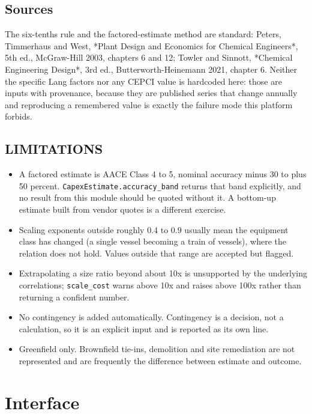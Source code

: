 \documentclass[10pt,a4paper,twoside]{report}
\begin{document}
\subsection*{Sources}

The six-tenths rule and the factored-estimate method are standard: Peters, Timmerhaus and West, *Plant Design and Economics for Chemical Engineers*, 5th ed., McGraw-Hill 2003, chapters 6 and 12; Towler and Sinnott, *Chemical Engineering Design*, 3rd ed., Butterworth-Heinemann 2021, chapter 6. Neither the specific Lang factors nor any CEPCI value is hardcoded here: those are inputs with provenance, because they are published series that change annually and reproducing a remembered value is exactly the failure mode this platform forbids.

\subsection*{LIMITATIONS}

\begin{itemize}
\item A factored estimate is AACE Class 4 to 5, nominal accuracy minus 30 to plus 50 percent. \texttt{CapexEstimate.accuracy\_band} returns that band explicitly, and no result from this module should be quoted without it. A bottom-up estimate built from vendor quotes is a different exercise.
\item Scaling exponents outside roughly 0.4 to 0.9 usually mean the equipment class has changed (a single vessel becoming a train of vessels), where the relation does not hold. Values outside that range are accepted but flagged.
\item Extrapolating a size ratio beyond about 10x is unsupported by the underlying correlations; \texttt{scale\_cost} warns above 10x and raises above 100x rather than returning a confident number.
\item No contingency is added automatically. Contingency is a decision, not a calculation, so it is an explicit input and is reported as its own line.
\item Greenfield only. Brownfield tie-ins, demolition and site remediation are not represented and are frequently the difference between estimate and outcome.
\end{itemize}

\section{Interface}
\end{document}
